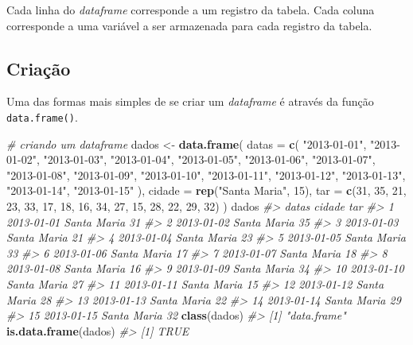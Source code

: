 \documentclass[]{book}
\newenvironment{Shaded}{\begin{snugshade}}{\end{snugshade}}
\newcommand{\KeywordTok}[1]{\textcolor[rgb]{0.13,0.29,0.53}{\textbf{#1}}}
\newcommand{\DataTypeTok}[1]{\textcolor[rgb]{0.13,0.29,0.53}{#1}}
\newcommand{\DecValTok}[1]{\textcolor[rgb]{0.00,0.00,0.81}{#1}}
\newcommand{\StringTok}[1]{\textcolor[rgb]{0.31,0.60,0.02}{#1}}
\newcommand{\CommentTok}[1]{\textcolor[rgb]{0.56,0.35,0.01}{\textit{#1}}}
\newcommand{\NormalTok}[1]{#1}
\begin{document}
Cada linha do \emph{dataframe} corresponde a um registro da tabela. Cada
coluna corresponde a uma variável a ser armazenada para cada registro da
tabela.

\subsection{Criação}\label{criacao-3}

Uma das formas mais simples de se criar um \emph{dataframe} é através da
função \texttt{data.frame()}.

\begin{Shaded}
\begin{Highlighting}[]
\CommentTok{# criando um dataframe}
\NormalTok{dados <-}\StringTok{ }\KeywordTok{data.frame}\NormalTok{(}
  \DataTypeTok{datas =} \KeywordTok{c}\NormalTok{(}
    \StringTok{"2013-01-01"}\NormalTok{, }\StringTok{"2013-01-02"}\NormalTok{, }\StringTok{"2013-01-03"}\NormalTok{, }\StringTok{"2013-01-04"}\NormalTok{, }\StringTok{"2013-01-05"}\NormalTok{,}
    \StringTok{"2013-01-06"}\NormalTok{, }\StringTok{"2013-01-07"}\NormalTok{, }\StringTok{"2013-01-08"}\NormalTok{, }\StringTok{"2013-01-09"}\NormalTok{, }\StringTok{"2013-01-10"}\NormalTok{,}
    \StringTok{"2013-01-11"}\NormalTok{, }\StringTok{"2013-01-12"}\NormalTok{, }\StringTok{"2013-01-13"}\NormalTok{, }\StringTok{"2013-01-14"}\NormalTok{, }\StringTok{"2013-01-15"}
\NormalTok{  ),}
  \DataTypeTok{cidade =} \KeywordTok{rep}\NormalTok{(}\StringTok{"Santa Maria"}\NormalTok{, }\DecValTok{15}\NormalTok{),}
  \DataTypeTok{tar =} \KeywordTok{c}\NormalTok{(}\DecValTok{31}\NormalTok{, }\DecValTok{35}\NormalTok{, }\DecValTok{21}\NormalTok{, }\DecValTok{23}\NormalTok{, }\DecValTok{33}\NormalTok{, }\DecValTok{17}\NormalTok{, }\DecValTok{18}\NormalTok{, }\DecValTok{16}\NormalTok{, }\DecValTok{34}\NormalTok{, }\DecValTok{27}\NormalTok{, }\DecValTok{15}\NormalTok{, }\DecValTok{28}\NormalTok{, }\DecValTok{22}\NormalTok{, }\DecValTok{29}\NormalTok{, }\DecValTok{32}\NormalTok{)}
\NormalTok{)}
\NormalTok{dados}
\CommentTok{#>         datas      cidade tar}
\CommentTok{#> 1  2013-01-01 Santa Maria  31}
\CommentTok{#> 2  2013-01-02 Santa Maria  35}
\CommentTok{#> 3  2013-01-03 Santa Maria  21}
\CommentTok{#> 4  2013-01-04 Santa Maria  23}
\CommentTok{#> 5  2013-01-05 Santa Maria  33}
\CommentTok{#> 6  2013-01-06 Santa Maria  17}
\CommentTok{#> 7  2013-01-07 Santa Maria  18}
\CommentTok{#> 8  2013-01-08 Santa Maria  16}
\CommentTok{#> 9  2013-01-09 Santa Maria  34}
\CommentTok{#> 10 2013-01-10 Santa Maria  27}
\CommentTok{#> 11 2013-01-11 Santa Maria  15}
\CommentTok{#> 12 2013-01-12 Santa Maria  28}
\CommentTok{#> 13 2013-01-13 Santa Maria  22}
\CommentTok{#> 14 2013-01-14 Santa Maria  29}
\CommentTok{#> 15 2013-01-15 Santa Maria  32}
\KeywordTok{class}\NormalTok{(dados)}
\CommentTok{#> [1] "data.frame"}
\KeywordTok{is.data.frame}\NormalTok{(dados)}
\CommentTok{#> [1] TRUE}
\end{Highlighting}
\end{Shaded}
\end{document}
